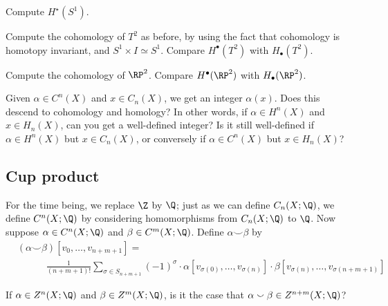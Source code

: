 \documentclass[12pt]{pset}
\newcommand{\cupp}{\smallsmile}
\begin{document}
\begin{requiredproblem}
  Compute $H^\star(S^1)$.
\end{requiredproblem}

\begin{problem}
  Compute the cohomology of $T^2$ as before, by using the fact that
  cohomology is homotopy invariant, and $S^1 \times I \simeq S^1$.
  Compare $H^\bullet(T^2)$ with $H_\bullet(T^2)$.
\end{problem}

\begin{requiredproblem}
  Compute the cohomology of $\RP^2$.  Compare $H^\bullet(\RP^2)$ with $H_\bullet(\RP^2)$.
\end{requiredproblem}

\begin{problem}
  Given $\alpha \in C^n(X)$ and $x \in C_n(X)$, we get an integer
  $\alpha(x)$.  Does this descend to cohomology and homology?  In other words, if
  $\alpha \in H^n(X)$ and $x \in H_n(X)$, can you get a well-defined integer?
  Is it still well-defined if $\alpha \in H^n(X)$ but  $x \in C_n(X)$, or conversely if
  $\alpha \in C^n(X)$ but $x \in H_n(X)$?
\end{problem}

\pagebreak

\subsection*{Cup product}

\begin{definition*}
  For the time being, we replace $\Z$ by $\Q$; just as we can define $C_n(X;\Q)$, we define $C^n(X;\Q)$ by considering homomorphisms from $C_n(X;\Q)$ to $\Q$.  Now suppose $\alpha \in C^n(X;\Q)$ and $\beta \in C^m(X;\Q)$.  Define $\alpha \cupp \beta$ by
  \begin{align*}
  & (\alpha \cupp \beta) [v_0,\ldots,v_{n+m+1}] = \\
  &\quad\quad\quad \frac{1}{(n+m+1)!} \sum_{\sigma \in S_{n+m+1}} (-1)^\sigma \cdot \alpha [v_{\sigma(0)},\ldots,v_{\sigma(n)}] \cdot \beta [v_{\sigma(n)},\ldots,v_{\sigma(n+m+1)}] 
  \end{align*}
\end{definition*}

\begin{requiredproblem}
  If $\alpha \in Z^n(X;\Q)$ and $\beta \in Z^m(X;\Q)$, is it the case that $\alpha \cupp \beta \in Z^{n+m}(X;\Q)$?
\end{requiredproblem}
\end{document}
